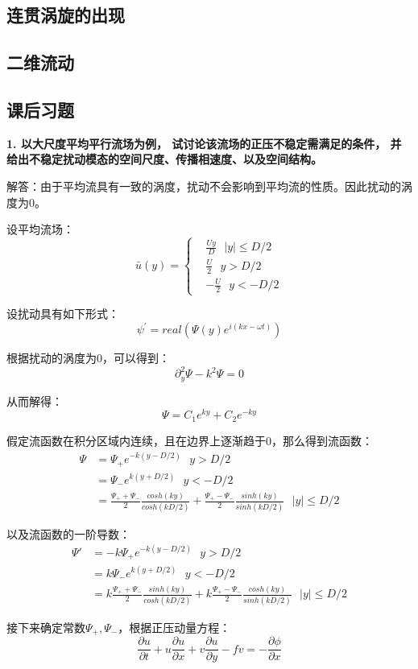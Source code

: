 \documentclass{article}
\begin{document}
\subsection{连贯涡旋的出现}
\subsection{二维流动}
\subsection{课后习题}
\textbf{1. 以大尺度平均平行流场为例，
试讨论该流场的正压不稳定需满足的条件，
并给出不稳定扰动模态的空间尺度、传播相速度、以及空间结构。}

解答：由于平均流具有一致的涡度，扰动不会影响到平均流的性质。因此扰动的涡度为0。

设平均流场：
$$\bar{u}(y)=\begin{cases}
    &\frac{Uy}{D} \ \ \    |y| \le D/2 \\
    &\frac{U}{2}  \ \ \  y > D/2 \\
    &-\frac{U}{2} \ \ \  y < -D/2
    \end{cases}$$

设扰动具有如下形式：
$$\psi^{\prime}=real\left(\Psi(y)e^{i(kx-\omega t)}\right)$$

根据扰动的涡度为0，可以得到：
$$\partial_y^2\Psi-k^2\Psi = 0$$

从而解得：
$$\Psi = C_1e^{ky} + C_2e^{-ky}$$

假定流函数在积分区域内连续，且在边界上逐渐趋于0，那么得到流函数：
\begin{align}
\Psi &  = \Psi_+ e^{-k(y-D/2)} \ \ \ y > D/2 \\
&  = \Psi_- e^{k(y+D/2)}  \ \ \ y <-D/2 \\
&  = \frac{\Psi_+ + \Psi_-}{2}\frac{cosh(ky)}{cosh(kD/2)} 
+ \frac{\Psi_+ - \Psi_-}{2}\frac{sinh(ky)}{sinh(kD/2)} \ \ \ |y| \le D/2
\end{align}

以及流函数的一阶导数：
\begin{align}
    \Psi' &  = -k\Psi_+ e^{-k(y-D/2)} \ \ \ y > D/2 \\
    &  = k\Psi_- e^{k(y+D/2)}  \ \ \ y <-D/2 \\
    &  = k\frac{\Psi_+ + \Psi_-}{2}\frac{sinh(ky)}{cosh(kD/2)} 
    + k\frac{\Psi_+ - \Psi_-}{2}\frac{cosh(ky)}{sinh(kD/2)} \ \ \ |y| \le D/2
\end{align}

接下来确定常数$\Psi_+, \Psi_-$，根据正压动量方程：
$$\frac{\partial u}{\partial t} + u\frac{\partial u}{\partial x} 
+v\frac{\partial u}{\partial y} - fv = -\frac{\partial\phi}{\partial x}$$
\end{document}
